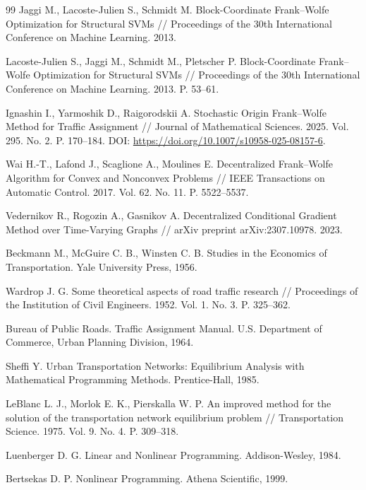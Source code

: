 \begin{thebibliography}{99}
Jaggi M., Lacoste-Julien S., Schmidt M. Block-Coordinate Frank--Wolfe Optimization for Structural SVMs // Proceedings of the 30th International Conference on Machine Learning. 2013.

Lacoste-Julien S., Jaggi M., Schmidt M., Pletscher P. Block-Coordinate Frank--Wolfe Optimization for Structural SVMs // Proceedings of the 30th International Conference on Machine Learning. 2013. P. 53--61.

Ignashin I., Yarmoshik D., Raigorodskii A. Stochastic Origin Frank--Wolfe Method for Traffic Assignment // Journal of Mathematical Sciences. 2025. Vol. 295. No. 2. P. 170--184. DOI: \url{https://doi.org/10.1007/s10958-025-08157-6}.

Wai H.-T., Lafond J., Scaglione A., Moulines E. Decentralized Frank--Wolfe Algorithm for Convex and Nonconvex Problems // IEEE Transactions on Automatic Control. 2017. Vol. 62. No. 11. P. 5522--5537.

Vedernikov R., Rogozin A., Gasnikov A. Decentralized Conditional Gradient Method over Time-Varying Graphs // arXiv preprint arXiv:2307.10978. 2023.

Beckmann M., McGuire C. B., Winsten C. B. Studies in the Economics of Transportation. Yale University Press, 1956.

Wardrop J. G. Some theoretical aspects of road traffic research // Proceedings of the Institution of Civil Engineers. 1952. Vol. 1. No. 3. P. 325--362.

Bureau of Public Roads. Traffic Assignment Manual. U.S. Department of Commerce, Urban Planning Division, 1964.

Sheffi Y. Urban Transportation Networks: Equilibrium Analysis with Mathematical Programming Methods. Prentice-Hall, 1985.

LeBlanc L. J., Morlok E. K., Pierskalla W. P. An improved method for the solution of the transportation network equilibrium problem // Transportation Science. 1975. Vol. 9. No. 4. P. 309--318.

Luenberger D. G. Linear and Nonlinear Programming. Addison-Wesley, 1984.

Bertsekas D. P. Nonlinear Programming. Athena Scientific, 1999.


\end{thebibliography}

